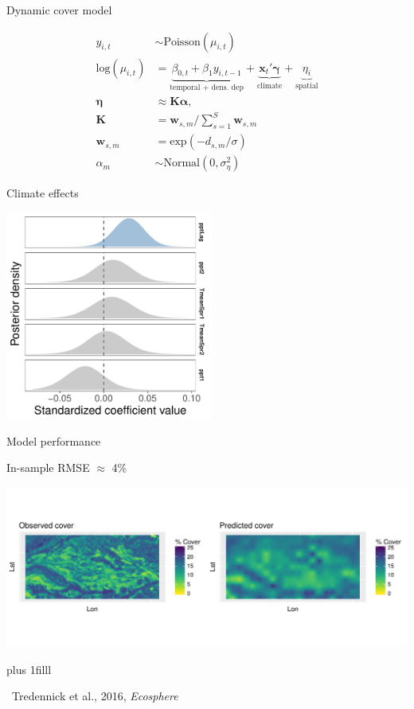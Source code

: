 \documentclass[12pt, compress, aspectratio=1610]{beamer}
\newcommand{\btVFill}{\vskip0pt plus 1filll}
\newcommand{\credit}[1]{\btVFill\par\hfill \footnotesize ~#1}
\begin{document}
\begin{frame}{%
\protect\hypertarget{dynamic-cover-model-1}{%
Dynamic cover model}}

\small

\begin{align*}
y_{i,t} &\sim \text{Poisson}(\mu_{i,t}) \\
\text{log}(\mu_{i,t}) &= \underbrace{\beta_{0,t} + \beta_{1}y_{i,t-1}}_\text{temporal + dens. dep} + \underbrace{\textbf{x}_{t}'\boldsymbol{\gamma}}_\text{climate} + \underbrace{\eta_{i}}_\text{spatial} \\
\boldsymbol{\eta} &\approx \textbf{K}\boldsymbol{\alpha}, \\
\textbf{K} &= \mathbf{w}_{s,m} / \sum_{s=1}^S \mathbf{w}_{s,m} \\
\mathbf{w}_{s,m} &= \text{exp}\left(-d_{s,m} / \sigma \right) \\
\alpha_{m} &\sim \text{Normal}(0,\sigma_{\eta}^2)
\end{align*}

\end{frame}

\begin{frame}{%
\protect\hypertarget{climate-effects}{%
Climate effects}}

\centering

\includegraphics[height=2.7in]{./figures/post_climate_covariates.pdf}

\end{frame}

\begin{frame}{%
\protect\hypertarget{model-performance}{%
Model performance}}

\small{In-sample RMSE $\approx$ 4\%}

\includegraphics[width=\textwidth]{./figures/obs_predict_spatial_pres.pdf}

\credit{Tredennick et al., 2016, \emph{Ecosphere}}

\end{frame}
\end{document}
